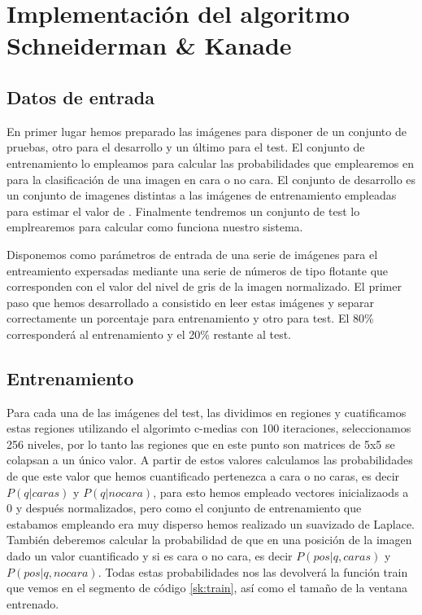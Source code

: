 \section{Implementación del algoritmo Schneiderman & Kanade}

\subsection{ Datos de entrada }

En primer lugar hemos preparado las imágenes para disponer de un conjunto de pruebas, otro para el desarrollo y un último para el test. El conjunto de entrenamiento lo empleamos para calcular las probabilidades que emplearemos en para la clasificación de una imagen en cara o no cara. El conjunto de desarrollo es un conjunto de imagenes distintas a las imágenes de entrenamiento empleadas para estimar el valor de \lambda. Finalmente tendremos un conjunto de test lo emplrearemos para calcular como funciona nuestro sistema.\par

Disponemos como parámetros de entrada de una serie de imágenes para el entreamiento expersadas mediante una serie de números de tipo flotante que corresponden con el valor del nivel de gris de la imagen normalizado. El primer paso que hemos desarrollado a consistido en leer estas imágenes y separar correctamente un porcentaje para entrenamiento y otro para test. El 80\% corresponderá al entrenamiento y el 20\% restante al test.\par


\subsection {Entrenamiento}
Para cada una de las imágenes del test, las dividimos en regiones y cuatificamos estas regiones utilizando el algorimto c-medias con 100 iteraciones, seleccionamos 256 niveles, por lo tanto las regiones que en este punto son matrices de 5x5 se colapsan a un único valor. A partir de estos valores calculamos las probabilidades de que este valor que hemos cuantificado pertenezca a cara o no caras, es decir $P(q | caras)$ y $P(q | no cara)$, para esto hemos empleado vectores inicializaods a 0 y después normalizados, pero como el conjunto de entrenamiento que estabamos empleando era muy disperso hemos realizado un suavizado de Laplace. También deberemos calcular la probabilidad de que en una posición de la imagen dado un valor cuantificado y si es cara o no cara, es decir  $P(pos|q, caras)$ y $P(pos|q, no cara)$. Todas estas probabilidades nos las devolverá la función train que vemos en el segmento de código \ref{sk:train}, así como el tamaño de la ventana entrenado. 

